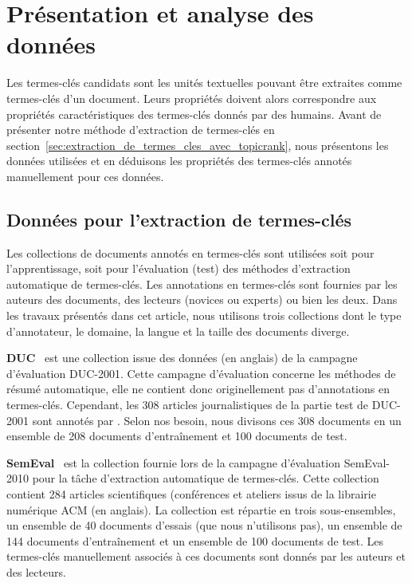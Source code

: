 \section{Présentation et analyse des données}
\label{sec:presentation_et_analyse_des_donnees}
  Les termes-clés candidats sont les unités textuelles pouvant être extraites
  comme termes-clés d'un document. Leurs propriétés doivent alors correspondre
  aux propriétés caractéristiques des termes-clés donnés par des humains. Avant
  de présenter notre méthode d'extraction de termes-clés en
  section~\ref{sec:extraction_de_termes_cles_avec_topicrank}, nous présentons
  les données utilisées et en déduisons les propriétés des termes-clés annotés
  manuellement pour ces données.

  \subsection{Données pour l'extraction de termes-clés}
  \label{subsec:corpus_pour_l_extraction_de_termes_cles}
    Les collections de documents annotés en termes-clés sont utilisées soit pour
    l'apprentissage, soit pour l'évaluation (test) des méthodes d'extraction
    automatique de termes-clés. Les annotations en termes-clés sont fournies par
    les auteurs des documents, des lecteurs (novices ou experts) ou bien les
    deux. Dans les travaux présentés dans cet article, nous utilisons trois
    collections dont le type d'annotateur, le domaine, la langue et la taille
    des documents diverge.

    \textbf{DUC}~\cite{over2001duc} est une collection issue des données (en
    anglais) de la campagne d'évaluation DUC-2001. Cette campagne d'évaluation
    concerne les méthodes de résumé automatique, elle ne contient donc
    originellement pas d'annotations en termes-clés. Cependant, les 308 articles
    journalistiques de la partie test de DUC-2001 sont annotés par
    . Selon nos besoin, nous divisons ces 308
    documents en un ensemble de 208 documents d'entraînement et 100 documents de
    test.

    \textbf{SemEval}~\cite{kim2010semeval} est la collection fournie lors de la
    campagne d'évaluation SemEval-2010 pour la tâche d'extraction automatique de
    termes-clés. Cette collection contient 284 articles scientifiques
    (conférences et ateliers issus de la librairie numérique ACM (en anglais).
    La collection est répartie en trois sous-ensembles, un ensemble de 40
    documents d'essais (que nous n'utilisons pas), un ensemble de 144 documents
    d'entraînement et un ensemble de 100 documents de test. Les termes-clés
    manuellement associés à ces documents sont donnés par les auteurs et des
    lecteurs.

